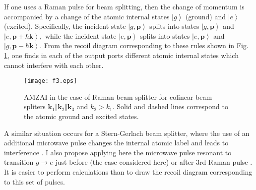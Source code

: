 \documentclass[twocolumn,showpacs,preprintnumbers]{revtex4}
\begin{document}
If one uses a Raman pulse for beam splitting, then the change of momentum is
accompanied by a change of the atomic internal states $\left\vert
g\right\rangle $ (ground) and $\left\vert e\right\rangle $ (excited).
Specifically, the incident state $\left\vert g,\mathbf{p}\right\rangle $
splits into states $\left\vert g,\mathbf{p}\right\rangle $ and $\left\vert e,%
\mathbf{p}+\hbar \mathbf{k}\right\rangle ,$ while the incident state $%
\left\vert e,\mathbf{p}\right\rangle $ splits into states $\left\vert e,%
\mathbf{p}\right\rangle $ and $\left\vert g,\mathbf{p}-\hbar \mathbf{k}%
\right\rangle $. From the recoil diagram corresponding to these rules shown
in Fig. \ref{f3}, one finds in each of the output ports different atomic
internal states which cannot interfere with each other. 

\begin{figure}[!t]
\texttt{[image: f3.eps]}
\caption{AMZAI in the case of Raman beam splitter for colinear beam spliters 
$\mathbf{k}_{1}\Vert \mathbf{k}_{2}\Vert \mathbf{k}_{3}$ and $k_{2}>k_{1}.$
Solid and dashed lines correspond to the atomic ground and excited states.}
\label{f3}
\end{figure} 

A similar
situation occurs for a Stern-Gerlach beam splitter, where the use of an
additional microwave pulse changes the internal atomic label and leads to
interference \cite{c11}. I also propose applying here the microwave pulse
resonant to transition $g\rightarrow e$ just before (the case considered
here) or after 3rd Raman pulse \cite{c11.1}. It is easier to perform
calculations than to draw the recoil diagram corresponding to this set of
pulses.
\end{document}
